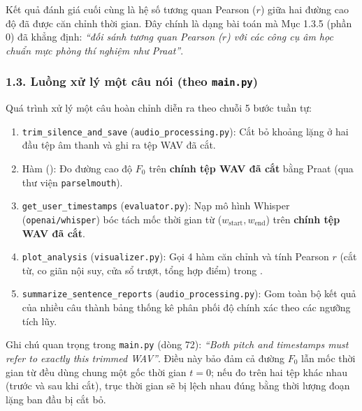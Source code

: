 \documentclass[11pt,a4paper]{article}
\begin{document}
Kết quả đánh giá cuối cùng là hệ số tương quan Pearson ($r$) giữa hai đường cao độ đã được căn chỉnh thời gian. Đây chính là dạng bài toán mà Mục 1.3.5 (phần 0) đã khẳng định: \textit{``đối sánh tương quan Pearson ($r$) với các công cụ âm học chuẩn mực phòng thí nghiệm như Praat''}.

\subsubsection*{1.3. Luồng xử lý một câu nói (theo \texttt{main.py})}
Quá trình xử lý một câu hoàn chỉnh diễn ra theo chuỗi 5 bước tuần tự:
\begin{enumerate}
    \setlength{\itemsep}{1.5pt}
    \item \texttt{trim\_silence\_and\_save} (\texttt{audio\_processing.py}): Cắt bỏ khoảng lặng ở hai đầu tệp âm thanh và ghi ra tệp WAV đã cắt.
    \item Hàm  (): Đo đường cao độ $F_0$ trên \textbf{chính tệp WAV đã cắt} bằng Praat (qua thư viện \texttt{parselmouth}).
    \item \texttt{get\_user\_timestamps} (\texttt{evaluator.py}): Nạp mô hình Whisper (\texttt{openai/whisper}) bóc tách mốc thời gian từ ($w_{\text{start}}, w_{\text{end}}$) trên \textbf{chính tệp WAV đã cắt}.
    \item \texttt{plot\_analysis} (\texttt{visualizer.py}): Gọi 4 hàm căn chỉnh và tính Pearson $r$ (cắt từ, co giãn nội suy, cửa sổ trượt, tổng hợp điểm) trong .
    \item \texttt{summarize\_sentence\_reports} (\texttt{audio\_processing.py}): Gom toàn bộ kết quả của nhiều câu thành bảng thống kê phân phối độ chính xác theo các ngưỡng tích lũy.
\end{enumerate}

Ghi chú quan trọng trong \texttt{main.py} (dòng 72): \textit{``Both pitch and timestamps must refer to exactly this trimmed WAV''}. Điều này bảo đảm cả đường $F_0$ lẫn mốc thời gian từ đều dùng chung một gốc thời gian $t = 0$; nếu đo trên hai tệp khác nhau (trước và sau khi cắt), trục thời gian sẽ bị lệch nhau đúng bằng thời lượng đoạn lặng ban đầu bị cắt bỏ.
\end{document}
